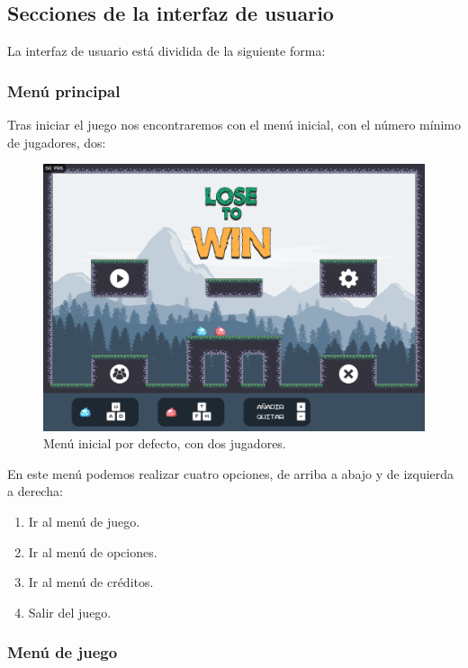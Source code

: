 \documentclass[12pt, spanish]{article}
\begin{document}
\newpage

\subsection{Secciones de la interfaz de usuario}

La interfaz de usuario está dividida de la siguiente forma:

\subsubsection{Menú principal}

Tras iniciar el juego nos encontraremos con el menú inicial, con el número mínimo de jugadores, dos:

\begin{figure}[H]
  \centering
	\includegraphics[width=\textwidth]{"interfaz/modo_inicial_defecto.png"}
  \caption{Menú inicial por defecto, con dos jugadores.}\label{figure:modo_inicial_defecto}
\end{figure}

En este menú podemos realizar cuatro opciones, de arriba a abajo y de izquierda a derecha:

\begin{enumerate}
	\item Ir al menú de juego.
	\item Ir al menú de opciones.
	\item Ir al menú de créditos.
	\item Salir del juego.
\end{enumerate}

\subsubsection{Menú de juego}
\end{document}
